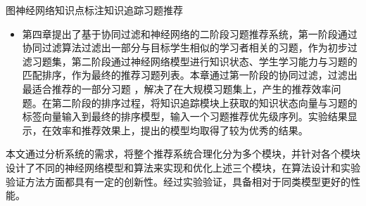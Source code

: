 \begin{abstractC}{图神经网络}{知识点标注}{知识追踪}{习题推荐}{}
\begin{itemize}
        \item 第四章提出了基于协同过滤和神经网络的二阶段习题推荐系统，第一阶段通过协同过滤算法过滤出一部分与目标学生相似的学习者相关的习题，作为初步过滤习题集，第二阶段通过神经网络模型进行知识状态、学生学习能力与习题的匹配排序，作为最终的推荐习题列表。本章通过第一阶段的协同过滤，过滤出最适合推荐的一部分习题 ，解决了在大规模习题集上，产生的推荐效率问题。在第二阶段的排序过程，将知识追踪模块上获取的知识状态向量与习题的标签向量输入到最终的排序模型，输入一个习题推荐优先级序列。实验结果显示，在效率和推荐效果上，提出的模型均取得了较为优秀的结果。
    \end{itemize}

    本文通过分析系统的需求，将整个推荐系统合理化分为多个模块，并针对各个模块设计了不同的神经网络模型和算法来实现和优化上述三个模块，在算法设计和实验验证方法方面都具有一定的创新性。经过实验验证，具备相对于同类模型更好的性能。
\end{abstractC}
